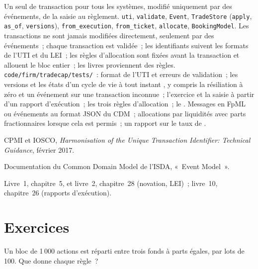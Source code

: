 \begin{build}
 Un seul  de transaction pour tous les systèmes, modifié uniquement par des événements, de la saisie au règlement.
 \texttt{uti}, \texttt{validate}, \texttt{Event}, \texttt{TradeStore} (\texttt{apply}, \texttt{as\_of},
\texttt{versions}), \texttt{from\_execution}, \texttt{from\_ticket}, \texttt{allocate}, \texttt{BookingModel}.
 Les transactions ne sont jamais modifiées directement, seulement par des événements~; chaque transaction est validée~; les identifiants suivent les formats de l'UTI et du LEI~; les règles d'allocation sont
fixées avant la transaction et allouent le bloc entier~; les livres proviennent des règles.
 \texttt{code/firm/tradecap/tests/}~: format de l'UTI et erreurs de validation~; les versions et les états d'un cycle de vie à tout instant
, y compris la résiliation à zéro et un événement sur une transaction inconnue~; l'exercice et la saisie à partir d'un rapport d'exécution~; les trois règles
d'allocation~; le .
 Messages en FpML ou événements au format JSON du CDM~; allocations par liquidités avec parts fractionnaires lorsque cela est permis~; un rapport sur le taux de
.
\end{build}

\begin{omsources}
\item CPMI et IOSCO, \emph{Harmonisation of the Unique Transaction Identifier: Technical Guidance}, février 2017.
\item Documentation du Common Domain Model de l'ISDA, «~Event Model~».
\item Livre~1, chapitre~5, et livre~2, chapitre~28 (novation, LEI)~; livre~10, chapitre~26 (rapports d'exécution).
\end{omsources}

\section{Exercices}

\begin{exercise}[$\star$]\label{exo:pl:trade-capture-and-booking:1}
Un bloc de 1\,000 actions est réparti entre trois fonds à parts égales, par lots de 100. Que donne chaque règle~?
\end{exercise}

